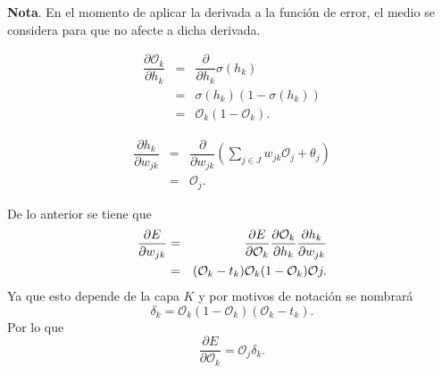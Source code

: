 \documentclass[12pt,letterpaper]{article}
\theoremstyle{definition}
\theoremstyle{definition}
\theoremstyle{definition}
\theoremstyle{definition}
\theoremstyle{definition}
\theoremstyle{definition}
\begin{document}
\textbf{Nota}. En el momento de aplicar la derivada a la función de error, el medio se considera para que no afecte a dicha derivada.
\begin{multicols}{2}
\begin{eqnarray*}
	\boxed{\dfrac{\partial \mathcal{O}_{k}}{\partial h_{k}}}{}&=&\dfrac{\partial} {\partial h_{k}} \sigma(h_{k})\\
	&=&\sigma(h_{k})(1-\sigma(h_{k})) \\
	&=&\mathcal{O}_{k}(1-\mathcal{O}_{k}).
\end{eqnarray*}

\begin{eqnarray*}
	\boxed{\dfrac{\partial h_{k}}{\partial w_{j k}}}{}&=&\dfrac{\partial}{\partial w_{j k}} \left(  \sum_{j \in J} w_{j k} \mathcal{O}_{j} + \theta_{j} \right)\\
	&=&\mathcal{O}_{j}.
\end{eqnarray*}
\end{multicols}
De lo anterior se tiene que
\begin{eqnarray*}
	\dfrac{\partial E}{\partial w_{j k}}&=&\textcolor{black}{\dfrac{\partial E}{\partial \mathcal{O}_{k}}}\textcolor{black}{\dfrac{\partial \mathcal{O}_{k}}{\partial h_{k}}} \dfrac{\partial h_{k}}{\partial w_{j k}}\\
	&=&\textcolor{black}{(\mathcal{O}_{k}-t_{k})}\textcolor{black}{\mathcal{O}_{k}(1-\mathcal{O}_{k})}\mathcal{O}{j}.
\end{eqnarray*}
Ya que esto depende de la capa $ K $ y por motivos de notación se nombrará
\[ \delta_{k}= \mathcal{O}_{k}(1-\mathcal{O}_{k})(\mathcal{O}_{k}-t_{k}). \]
Por lo que
\[ \dfrac{\partial E}{\partial \mathcal{O}_{k}}= \mathcal{O}_{j}\delta_{k}. \]
\end{document}
